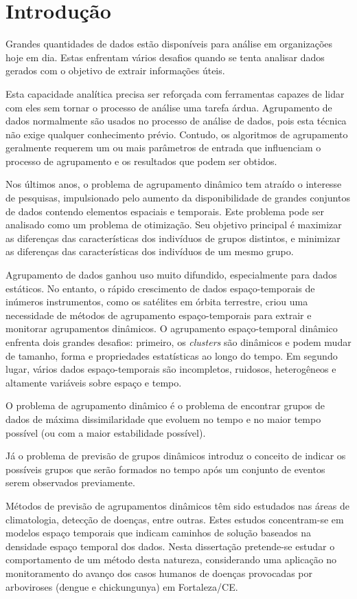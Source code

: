 \chapter{Introdução}
\label{chap:introducao}
Grandes quantidades de dados estão disponíveis para análise em organizações hoje em dia. Estas enfrentam vários desafios quando se tenta analisar dados gerados com o objetivo de extrair informações úteis.

Esta capacidade analítica precisa ser reforçada com ferramentas capazes de lidar com eles sem tornar o processo de análise uma tarefa árdua.
Agrupamento de dados normalmente são usados no processo de análise de dados, pois esta técnica não exige qualquer conhecimento prévio. Contudo, os algoritmos de agrupamento geralmente requerem um ou mais parâmetros de entrada que influenciam o processo de agrupamento e os resultados que podem ser obtidos. 

Nos últimos anos, o problema de agrupamento dinâmico tem atraído o interesse de pesquisas, impulsionado pelo aumento da disponibilidade de grandes conjuntos de dados contendo elementos espaciais e temporais. Este problema pode ser analisado como um problema de otimização. Seu objetivo principal é maximizar as diferenças das características dos indivíduos de grupos distintos, e minimizar as diferenças das características dos indivíduos de um mesmo grupo.

Agrupamento de dados ganhou uso muito difundido, especialmente para dados estáticos. No entanto, o rápido crescimento de dados espaço-temporais de inúmeros instrumentos, como os satélites em órbita terrestre, criou uma necessidade de métodos de agrupamento espaço-temporais para extrair e monitorar agrupamentos dinâmicos. O agrupamento espaço-temporal dinâmico enfrenta dois grandes desafios: primeiro, os \textit{clusters} são dinâmicos e podem mudar de tamanho, forma e propriedades estatísticas ao longo do tempo. Em segundo lugar, vários dados espaço-temporais são incompletos, ruidosos, heterogêneos e altamente variáveis sobre espaço e tempo.


O problema de agrupamento dinâmico é o problema de encontrar grupos de dados de máxima dissimilaridade que evoluem no tempo e no maior tempo possível (ou com a maior estabilidade possível).

Já o problema de previsão de grupos dinâmicos introduz o conceito de indicar os possíveis grupos que serão formados no tempo após um conjunto de eventos serem observados previamente.

Métodos de previsão de agrupamentos dinâmicos têm sido estudados nas áreas de climatologia, detecção de doenças, entre outras. Estes estudos concentram-se em modelos espaço temporais que indicam caminhos de solução baseados na densidade espaço temporal dos dados. Nesta dissertação pretende-se estudar o comportamento de um método desta natureza, considerando uma aplicação no monitoramento do avanço dos casos humanos de doenças provocadas por arboviroses (dengue e chickungunya) em Fortaleza/CE.

